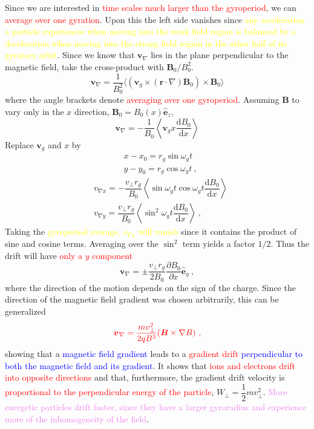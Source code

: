 \documentclass[12pt,a4paper]{article}
\renewcommand{\vec}[1]{\boldsymbol{#1}}
\newcommand{\dif}{\mathrm{d}}
\begin{document}
Since we are interested in \textcolor{red}{time scales much larger than the gyroperiod}, we can \textcolor{red}{average over one gyration}. Upon this the left side vanishes since \textcolor{yellow}{any acceleration a particle experiences when moving into the weak field region is balanced by a deceleration when moving into the strong field region in the other half of its gyratory orbit}. Since we know that $\vec{v}_\nabla$ lies in the plane perpendicular to the magnetic field, take the cross-product with $\vec{B}_0/B_0^2$. 
\begin{equation}
\vec{v}_\nabla = \dfrac{1}{B^2_0} \langle (\vec{v}_g \times (\vec{r} \cdot \nabla) \vec{B}_0) \times \vec{B}_0 \rangle
\end{equation}
where the angle brackets denote \textcolor{red}{averaging over one gyroperiod}. Assuming $\vec{B}$ to vary only in the $x$ direction, $\vec{B}_0 = B_0(x) \vec{\hat{e}}_z$,
\begin{equation}
\vec{v}_\nabla = -\dfrac{1}{B_0} \left\langle \vec{v}_g x \dfrac{\dif B_0}{\dif x} \right\rangle
\end{equation}
Replace $\vec{v}_g$ and $x$ by 
\begin{align}
& \nonumber x-x_0 = r_g \sin \omega_g t \\
& \nonumber y-y_0 = r_g \cos \omega_g t ~,
\end{align}
\begin{align}
& v_{\nabla x} = -\dfrac{v_\perp r_g}{B_0} \left\langle \sin \omega_g t \cos \omega_g t \dfrac{\dif B_0}{\dif x} \right\rangle \\
& v_{\nabla y} = \dfrac{v_\perp r_g}{B_0} \left\langle \sin^2 \omega_g t \dfrac{\dif B_0}{\dif x} \right\rangle ~,
\end{align}
Taking the \textcolor{yellow}{gyroperiod average, $v_{\nabla x}$ will vanish} since it contains the product of sine and cosine terms. Averaging over the $\sin^2$ term yields a factor $1/2$. Thus the drift will have \textcolor{red}{only a $y$ component}
\begin{equation}
\vec{v}_{\nabla} = \pm \dfrac{v_\perp r_g}{2 B_0} \dfrac{\partial B_0}{\partial x} \vec{\hat{e}}_y ~,
\end{equation}
where the direction of the motion depends on the sign of the charge. Since the direction of the magnetic field gradient was chosen arbitrarily, this can be generalized
\begin{equation}
\color{red} \vec{v}_{\nabla} = \dfrac{m v_\perp^2}{2 q B^3} (\vec{B} \times \nabla B) ~,
\end{equation}
showing that a \textcolor{blue}{magnetic field gradient} leads to a \textcolor{red}{gradient drift} \textcolor{blue}{perpendicular to both the magnetic field and its gradient}. It shows that \textcolor{red}{ions and electrons drift into opposite directions} and that, furthermore, the gradient drift velocity is  \textcolor{red}{proportional to the perpendicular energy of the particle}, $W_\perp = \dfrac{1}{2}mv_\perp^2$. \textcolor{violet}{More energetic particles drift faster, since they have a larger gyroradius and experience more of the inhomogeneity of the field}.
\end{document}
